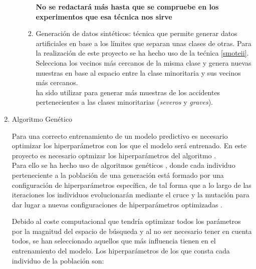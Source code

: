 \begin{enumerate}
\begin{enumerate}
\begin{enumerate}
                        
                        \cite{Downsampling}

                        \textbf{No se redactará más hasta que se compruebe en los experimentos que esa técnica nos sirve}
                        

                        \item Generación de datos sintéticos: técnica que permite generar datos artificiales en base a los límites que separan unas clases de otras. Para la realización de este proyecto se ha hecho uso de la tećnica  \ref{smoteii}. Selecciona los vecinos más cercanos de la misma clase y genera nuevas muestras en base al espacio entre la clase minoritaria y sus vecinos más cercanos.\\

                         ha sido utilizar para generar más muestras de los accidentes pertenecientes a las clases minoritarias (\textit{severos} y \textit{graves}).

                    \end{enumerate}

            \end{enumerate}



        \item Algoritmo Genético

            Para una correcto entrenamiento de un modelo predictivo es necesario optimizar los hiperparámetros con los que el modelo será entrenado. En este proyecto es necesario optmizar los hiperparámetros del algoritmo .\\

            Para ello se ha hecho uso de algoritmos genéticos \cite{GAXGBoostCode}, donde cada individuo perteneciente a la población de una generación está formado por una configuración de hiperparámetros específica, de tal forma que a lo largo de las iteraciones los individuos evolucionarán mediante el cruce y la mutación para dar lugar a nuevas configuraciones de hiperparámetros optimizadas \cite{GAXGBoostPaper}.

            Debido al coste computacional que tendría optimizar todos los parámetros por la magnitud del espacio de búsqueda y al no ser necesario tener en cuenta todos, se han seleccionado aquellos que más influencia tienen en el entrenamiento del modelo. Los hiperparámetros de los que consta cada individuo de la población son:


\end{enumerate}
